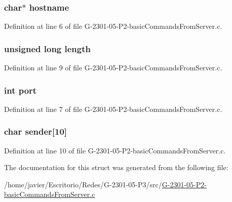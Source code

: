 \hypertarget{structthread_recv_args_af203df082d5c6dcaa0c88b07cf86466d}{
\subsubsection[{hostname}]{\setlength{\rightskip}{0pt plus 5cm}char$\ast$ hostname}}\label{structthread_recv_args_af203df082d5c6dcaa0c88b07cf86466d}


Definition at line 6 of file G-\/2301-\/05-\/\-P2-\/basic\-Commands\-From\-Server.\-c.

\hypertarget{structthread_recv_args_a9ee64c7b918513891b3834b93ad0e501}{
\subsubsection[{length}]{\setlength{\rightskip}{0pt plus 5cm}unsigned long length}}\label{structthread_recv_args_a9ee64c7b918513891b3834b93ad0e501}


Definition at line 9 of file G-\/2301-\/05-\/\-P2-\/basic\-Commands\-From\-Server.\-c.

\hypertarget{structthread_recv_args_a63c89c04d1feae07ca35558055155ffb}{
\subsubsection[{port}]{\setlength{\rightskip}{0pt plus 5cm}int port}}\label{structthread_recv_args_a63c89c04d1feae07ca35558055155ffb}


Definition at line 7 of file G-\/2301-\/05-\/\-P2-\/basic\-Commands\-From\-Server.\-c.

\hypertarget{structthread_recv_args_abe5ba910d6dc4c312cb722de3ab377f2}{
\subsubsection[{sender}]{\setlength{\rightskip}{0pt plus 5cm}char sender\mbox{[}10\mbox{]}}}\label{structthread_recv_args_abe5ba910d6dc4c312cb722de3ab377f2}


Definition at line 10 of file G-\/2301-\/05-\/\-P2-\/basic\-Commands\-From\-Server.\-c.



The documentation for this struct was generated from the following file\-:\begin{DoxyCompactItemize}
\item 
/home/javier/\-Escritorio/\-Redes/\-G-\/2301-\/05-\/\-P3/src/\hyperlink{_g-2301-05-_p2-basic_commands_from_server_8c}{G-\/2301-\/05-\/\-P2-\/basic\-Commands\-From\-Server.\-c}\end{DoxyCompactItemize}
